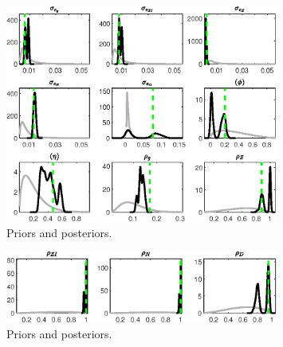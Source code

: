  
\begin{figure}[H]
\centering
\includegraphics[width=0.80\textwidth]{BRS_growth_id/Output/BRS_growth_id_PriorsAndPosteriors1}
\caption{Priors and posteriors.}\label{Fig:PriorsAndPosteriors:1}
\end{figure}
 
\begin{figure}[H]
\centering
\includegraphics[width=0.80\textwidth]{BRS_growth_id/Output/BRS_growth_id_PriorsAndPosteriors2}
\caption{Priors and posteriors.}\label{Fig:PriorsAndPosteriors:2}
\end{figure}
 
